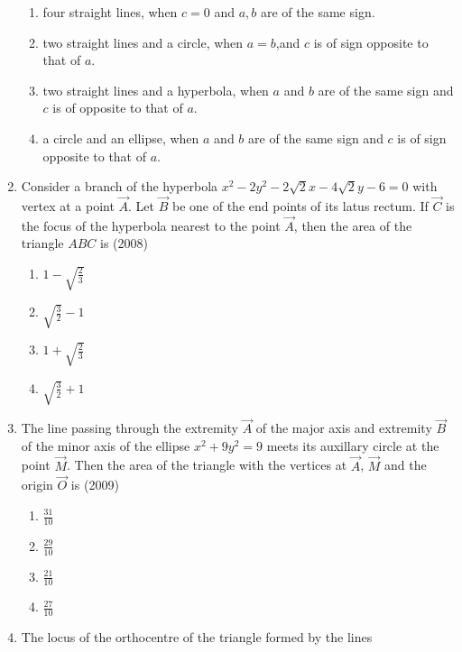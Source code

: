 \begin{enumerate}
\begin{enumerate}
    \item four straight lines, when $c=0$ and $a, b$ are of the same sign.
    \item two straight lines and a circle, when $a=b$,and $c$ is of sign opposite to that of $a$.
    \item two straight lines and a hyperbola, when $a$ and $b$ are of the same sign and $c$ is of opposite to that of $a$.
    \item a circle and an ellipse, when $a$ and $b$ are of the same sign and $c$ is of sign opposite to that of $a$.
\end{enumerate}
\item Consider a branch of the hyperbola $x^{2}-2y^{2}-2\sqrt{2}x-4\sqrt{2}y-6=0$ with vertex at a point  $\vec{A}$. Let  $\vec{B}$  be one of the end points of its latus rectum. If $\vec{C}$ is the focus of the hyperbola nearest to the point  $\vec{A}$, then the area of the triangle $ABC$ is \hfill{(2008)}
\begin{multicols}{4}
\begin{enumerate}
    \item $1-\sqrt{\frac{2}{3}}$
    \item $\sqrt{\frac{3}{2}}-1$
    \item $1+\sqrt{\frac{2}{3}}$
    \item $\sqrt{\frac{3}{2}}+1$
\end{enumerate}
\end{multicols}
\item The line passing through the extremity $\vec{A}$ of the major axis and extremity $\vec{B}$ of the minor axis of the ellipse $x^{2}+9y^{2}=9$ meets its auxillary circle at the point $\vec{M}$. Then the area of the triangle with the vertices at $\vec{A}$, $\vec{M}$ and the origin $\vec{O}$ is \hfill{(2009)}
\begin{multicols}{4}
\begin{enumerate}
    \item $\frac{31}{10}$
    \item $\frac{29}{10}$
    \item $\frac{21}{10}$
    \item $\frac{27}{10}$
\end{enumerate}\end{multicols}
\item The locus of the orthocentre of the triangle formed by the lines
		

\end{enumerate}

